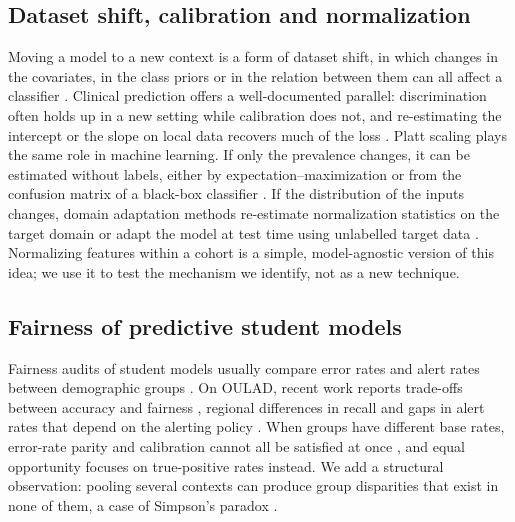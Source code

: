 \documentclass[fleqn,10pt]{JLA_article}
\begin{document}
\subsection{Dataset shift, calibration and normalization}
Moving a model to a new context is a form of dataset shift, in which changes in the covariates, in the class priors or in the relation between them can all affect a classifier \parencite{morenotorres2012shift}. Clinical prediction offers a well-documented parallel: discrimination often holds up in a new setting while calibration does not, and re-estimating the intercept or the slope on local data recovers much of the loss \parencite{janssen2008updating,vancalster2019calibration}. Platt scaling \parencite{platt1999probabilistic} plays the same role in machine learning. If only the prevalence changes, it can be estimated without labels, either by expectation--maximization \parencite{saerens2002priors} or from the confusion matrix of a black-box classifier \parencite{lipton2018labelshift}. If the distribution of the inputs changes, domain adaptation methods re-estimate normalization statistics on the target domain \parencite{li2018adabn} or adapt the model at test time using unlabelled target data \parencite{wang2021tent}. Normalizing features within a cohort is a simple, model-agnostic version of this idea; we use it to test the mechanism we identify, not as a new technique.

\subsection{Fairness of predictive student models}
Fairness audits of student models usually compare error rates and alert rates between demographic groups \parencite{gardner2019slicing,baker2022bias}. On OULAD, recent work reports trade-offs between accuracy and fairness \parencite{opoku2025tradeoffs}, regional differences in recall \parencite{elsayed2026fairness} and gaps in alert rates that depend on the alerting policy \parencite{wu2026calibrated}. When groups have different base rates, error-rate parity and calibration cannot all be satisfied at once \parencite{chouldechova2017fair,kleinberg2017tradeoffs}, and equal opportunity \parencite{hardt2016equality} focuses on true-positive rates instead. We add a structural observation: pooling several contexts can produce group disparities that exist in none of them, a case of Simpson's paradox \parencite{simpson1951}.

\end{document}

